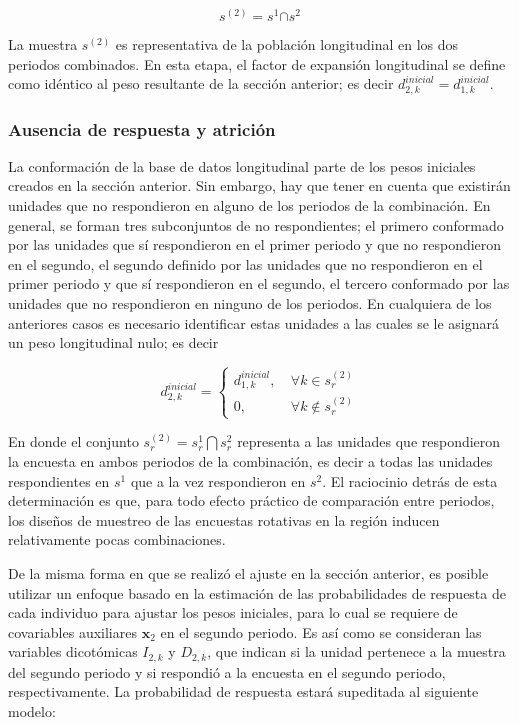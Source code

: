 \documentclass[
  12pt,
  spanish,
]{book}
\begin{document}
\[
s^{(2)} = s^1 \boldsymbol\cap s^2
\]

La muestra \(s^{(2)}\) es representativa de la población longitudinal en los dos periodos combinados. En esta etapa, el factor de expansión longitudinal se define como idéntico al peso resultante de la sección anterior; es decir \(d_{2, k}^{inicial} = d_{1, k}^{inicial}\).

\hypertarget{ausencia-de-respuesta-y-atriciuxf3n}{%
\subsubsection{Ausencia de respuesta y atrición}\label{ausencia-de-respuesta-y-atriciuxf3n}}

La conformación de la base de datos longitudinal parte de los pesos iniciales creados en la sección anterior. Sin embargo, hay que tener en cuenta que existirán unidades que no respondieron en alguno de los periodos de la combinación. En general, se forman tres subconjuntos de no respondientes; el primero conformado por las unidades que sí respondieron en el primer periodo y que no respondieron en el segundo, el segundo definido por las unidades que no respondieron en el primer periodo y que sí respondieron en el segundo, el tercero conformado por las unidades que no respondieron en ninguno de los periodos. En cualquiera de los anteriores casos es necesario identificar estas unidades a las cuales se le asignará un peso longitudinal nulo; es decir

\begin{equation*}
d_{2, k}^{inicial} =
\begin{cases}
d_{1, k}^{inicial}, &\ \forall k \in s_r^{(2)}  \\
0, &\ \forall k \notin s_r^{(2)}
\end{cases}
\end{equation*}

En donde el conjunto \(s_r^{(2)} = s_r^1 \boldsymbol\bigcap s_r^2\) representa a las unidades que respondieron la encuesta en ambos periodos de la combinación, es decir a todas las unidades respondientes en \(s^1\) que a la vez respondieron en \(s^2\). El raciocinio detrás de esta determinación es que, para todo efecto práctico de comparación entre periodos, los diseños de muestreo de las encuestas rotativas en la región inducen relativamente pocas combinaciones.

De la misma forma en que se realizó el ajuste en la sección anterior, es posible utilizar un enfoque basado en la estimación de las probabilidades de respuesta de cada individuo para ajustar los pesos iniciales, para lo cual se requiere de covariables auxiliares \(\mathbf{x}_{2}\) en el segundo periodo. Es así como se consideran las variables dicotómicas \(I_{2, k}\) y \(D_{2, k}\), que indican si la unidad pertenece a la muestra del segundo periodo y si respondió a la encuesta en el segundo periodo, respectivamente. La probabilidad de respuesta estará supeditada al siguiente modelo:
\end{document}
